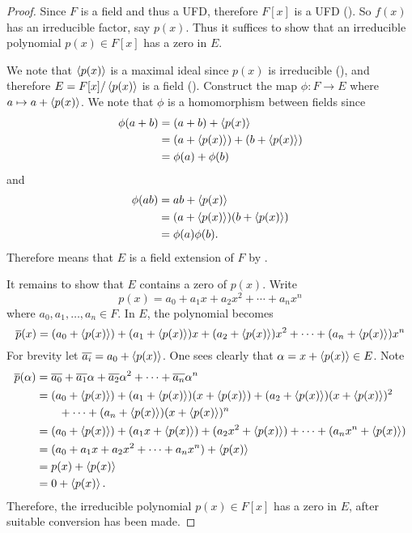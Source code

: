 \begin{proof}
    Since $F$ is a field and thus a UFD, therefore $F[x]$ is a UFD (). So $f(x)$ has an irreducible factor, say $p(x)$. Thus it suffices to show that an irreducible polynomial $p(x) \in F[x]$ has a zero in $E$.

    We note that $\left\langle p(x)\right\rangle$ is a maximal ideal since $p(x)$ is irreducible (), and therefore $E = F[x]/\left\langle p(x)\right\rangle$ is a field (). Construct the map $\phi: F \to E$ where $a \mapsto a + \left\langle p(x)\right\rangle$. We note that $\phi$ is a homomorphism between fields since
    \begin{align*}
        \phi(a+b) &= (a+b) + \left\langle p(x)\right\rangle\\
        &= (a + \left\langle p(x)\right\rangle) + (b + \left\langle p(x)\right\rangle)\\
        &= \phi(a) + \phi(b)
    \end{align*}
    and
    \begin{align*}
        \phi(ab) &= ab + \left\langle p(x)\right\rangle\\
        &= (a+\left\langle p(x)\right\rangle)(b+\left\langle p(x)\right\rangle)\\
        &= \phi(a)\phi(b).
    \end{align*}
    Therefore means that $E$ is a field extension of $F$ by .

    It remains to show that $E$ contains a zero of $p(x)$. Write
    \[
        p(x) = a_0 + a_1x + a_2x^2 + \cdots + a_nx^n
    \]
    where $a_0, a_1, \dots, a_n \in F$. In $E$, the polynomial becomes
    \[
        \overline{p}(x) = (a_0 + \left\langle p(x)\right\rangle) + (a_1 + \left\langle p(x)\right\rangle)x + (a_2 + \left\langle p(x)\right\rangle)x^2 + \cdots + (a_n + \left\langle p(x)\right\rangle)x^n
    \]
    For brevity let $\overline{a_i} = a_0 + \left\langle p(x)\right\rangle$. One sees clearly that $\alpha = x + \left\langle p(x)\right\rangle \in E$. Note
    \begin{align*}
        \overline{p}(\alpha) &= \overline{a_0} + \overline{a_1}\alpha + \overline{a_2}\alpha^2 + \cdots + \overline{a_n}\alpha^n\\
        &= (a_0 + \left\langle p(x)\right\rangle) + (a_1 + \left\langle p(x)\right\rangle)(x + \left\langle p(x)\right\rangle) + (a_2 + \left\langle p(x)\right\rangle)(x + \left\langle p(x)\right\rangle)^2\\
        &\quad\quad+ \cdots + (a_n + \left\langle p(x)\right\rangle)(x + \left\langle p(x)\right\rangle)^n\\
        &= (a_0 + \left\langle p(x)\right\rangle) + (a_1x + \left\langle p(x)\right\rangle) + (a_2x^2 + \left\langle p(x)\right\rangle) + \cdots + (a_nx^n + \left\langle p(x)\right\rangle)\\
        &= (a_0 + a_1x + a_2x^2 + \cdots + a_nx^n) + \left\langle p(x)\right\rangle\\
        &= p(x) + \left\langle p(x)\right\rangle\\
        &= 0 + \left\langle p(x)\right\rangle.
    \end{align*}
    Therefore, the irreducible polynomial $p(x) \in F[x]$ has a zero in $E$, after suitable conversion has been made.
\end{proof}

